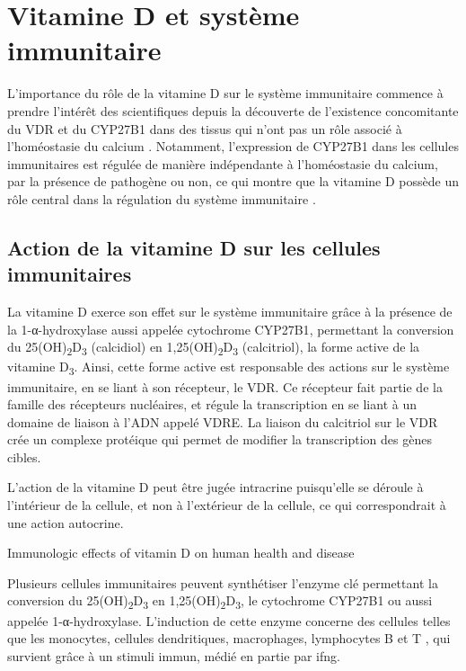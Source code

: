 \documentclass[
  a4paper,
  DIV=11,
  numbers=noendperiod,
  listof=totoc]{scrreprt}
\begin{document}
\newpage{}

\hypertarget{vitamine-d-et-systuxe8me-immunitaire}{%
\chapter{Vitamine D et système
immunitaire}\label{vitamine-d-et-systuxe8me-immunitaire}}

L'importance du rôle de la vitamine D sur le système immunitaire
commence à prendre l'intérêt des scientifiques depuis la découverte de
l'existence concomitante du \ac{VDR} et du \ac{CYP27B1} dans des tissus
qui n'ont pas un rôle associé à l'homéostasie du calcium
\autocite{Zehnder.2001}. Notamment, l'expression de CYP27B1 dans les
cellules immunitaires est régulée de manière indépendante à
l'homéostasie du calcium, par la présence de pathogène ou non, ce qui
montre que la vitamine D possède un rôle central dans la régulation du
système immunitaire \autocite{White.2022}.

\hypertarget{action-de-la-vitamine-d-sur-les-cellules-immunitaires}{%
\section{Action de la vitamine D sur les cellules
immunitaires}\label{action-de-la-vitamine-d-sur-les-cellules-immunitaires}}

La vitamine D exerce son effet sur le système immunitaire grâce à la
présence de la 1-α-hydroxylase aussi appelée cytochrome \ac{CYP27B1},
permettant la conversion du 25(OH)\textsubscript{2}D\textsubscript{3}
(calcidiol) en 1,25(OH)\textsubscript{2}D\textsubscript{3} (calcitriol),
la forme active de la vitamine D\textsubscript{3}. Ainsi, cette forme
active est responsable des actions sur le système immunitaire, en se
liant à son récepteur, le VDR. Ce récepteur fait partie de la famille
des récepteurs nucléaires, et régule la transcription en se liant à un
domaine de liaison à l'ADN appelé \ac{VDRE}. La liaison du calcitriol
sur le \ac{VDR} crée un complexe protéique qui permet de modifier la
transcription des gènes cibles.

L'action de la vitamine D peut être jugée intracrine puisqu'elle se
déroule à l'intérieur de la cellule, et non à l'extérieur de la cellule,
ce qui correspondrait à une action autocrine.

Immunologic effects of vitamin D on human health and disease

Plusieurs cellules immunitaires peuvent synthétiser l'enzyme clé
permettant la conversion du 25(OH)\textsubscript{2}D\textsubscript{3} en
1,25(OH)\textsubscript{2}D\textsubscript{3}, le cytochrome CYP27B1 ou
aussi appelée 1-α-hydroxylase. L'induction de cette enzyme concerne des
cellules telles que les monocytes, cellules dendritiques, macrophages,
lymphocytes B et T \autocite{Meza-Meza.2020,Dankers.2017}, qui survient
grâce à un stimuli immun, médié en partie par \ac{ifng}.
\end{document}
